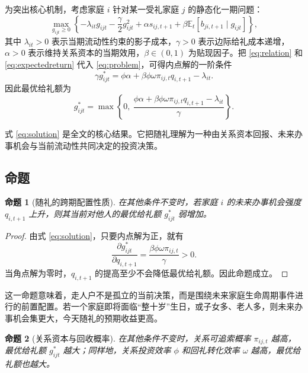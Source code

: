 \documentclass[12pt,a4paper]{ctexart}
\newtheorem{proposition}{命题}
\newcommand{\E}{\mathbb{E}}
\begin{document}
为突出核心机制，考虑家庭 $i$ 针对某一受礼家庭 $j$ 的静态化一期问题：
\begin{equation}
\max_{g_{ijt}\geq 0}
\left\{
 -\lambda_{it} g_{ijt}
 -\frac{\gamma}{2}g_{ijt}^2
 +\alpha s_{ij,t+1}
 +\beta \E_t[b_{ji,t+1}\mid g_{ijt}]
\right\},
\label{eq:problem}
\end{equation}
其中 $\lambda_{it}>0$ 表示当期流动性约束的影子成本，$\gamma>0$ 表示边际给礼成本递增，$\alpha>0$ 表示维持关系资本的当期效用，$\beta\in(0,1)$ 为贴现因子。把 \eqref{eq:relation} 和 \eqref{eq:expectedreturn} 代入 \eqref{eq:problem}，可得内点解的一阶条件
\begin{equation}
\gamma g_{ijt}^*
 =
\phi\alpha
 +
\beta \phi \omega \pi_{ij,t} q_{i,t+1}
 -
\lambda_{it}.
\label{eq:foc}
\end{equation}
因此最优给礼额为
\begin{equation}
g_{ijt}^*
 =
\max\left\{
0,\
\frac{\phi\alpha+\beta\phi\omega \pi_{ij,t} q_{i,t+1}-\lambda_{it}}{\gamma}
\right\}.
\label{eq:solution}
\end{equation}

式 \eqref{eq:solution} 是全文的核心结果。它把随礼理解为一种由关系资本回报、未来办事机会与当前流动性共同决定的投资决策。

\subsection{命题}

\begin{proposition}[随礼的跨期配置性质]
在其他条件不变时，若家庭 $i$ 的未来办事机会强度 $q_{i,t+1}$ 上升，则其当前对他人的最优给礼额 $g_{ijt}^*$ 弱增加。
\end{proposition}

\begin{proof}
由式 \eqref{eq:solution}，只要内点解为正，就有
\[
\frac{\partial g_{ijt}^*}{\partial q_{i,t+1}}
=
\frac{\beta\phi\omega \pi_{ij,t}}{\gamma}
>0.
\]
当角点解为零时，$q_{i,t+1}$ 的提高至少不会降低最优给礼额。因此命题成立。
\end{proof}

这一命题意味着，走人户不是孤立的当前决策，而是围绕未来家庭生命周期事件进行的前置配置。若一个家庭即将面临“整十岁”生日，或子女多、老人多，则未来办事机会集更大，今天随礼的预期收益更高。

\begin{proposition}[关系资本与回收概率]
在其他条件不变时，关系可追索概率 $\pi_{ij,t}$ 越高，最优给礼额 $g_{ijt}^*$ 越大；同样地，关系投资效率 $\phi$ 和回礼转化效率 $\omega$ 越高，最优给礼额也越大。
\end{proposition}
\end{document}
